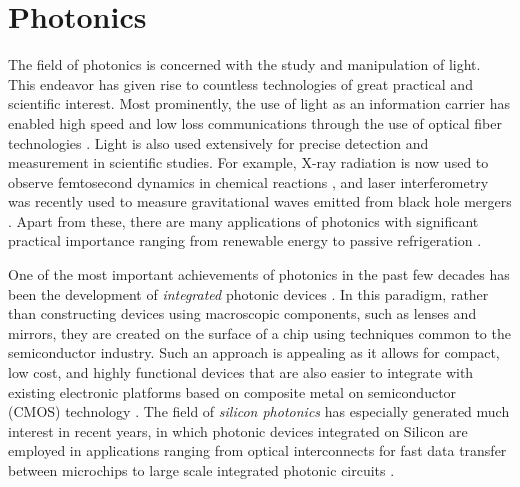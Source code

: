 
\section{Photonics}


The field of photonics is concerned with the study and manipulation of light.
This endeavor has given rise to countless technologies of great practical and scientific interest.
Most prominently, the use of light as an information carrier has enabled high speed and low loss communications through the use of optical fiber technologies \cite{agrawal_fiber-optic_2012}.
Light is also used extensively for precise detection and measurement in  scientific studies.  
For example, X-ray radiation is now used to observe femtosecond dynamics in chemical reactions \cite{kern_structures_2018}, and laser interferometry was recently used to measure gravitational waves emitted from black hole mergers \cite{ligo_scientific_collaboration_and_virgo_collaboration_observation_2016}.
Apart from these, there are many applications of photonics with significant practical importance ranging from renewable energy \cite{carlson_amorphous_1976,yu_fundamental_2010} to passive refrigeration \cite{raman_passive_2014,hsu_radiative_2016}.

One of the most important achievements of photonics in the past few decades has been the development of \textit{integrated} photonic devices \cite{pollock_integrated_2010}.
In this paradigm, rather than constructing devices using macroscopic components, such as lenses and mirrors, they are created on the surface of a chip using techniques common to the semiconductor industry.
Such an approach is appealing as it allows for compact, low cost, and highly functional devices that are also easier to integrate with existing electronic platforms based on composite metal on semiconductor (CMOS) technology \cite{weste_principles_1985}.
The field of \textit{silicon photonics} has especially generated much interest in recent years, in which photonic devices integrated on Silicon are employed in applications ranging from optical interconnects for fast data transfer between microchips to large scale integrated photonic circuits \cite{jalali_silicon_2006}.

